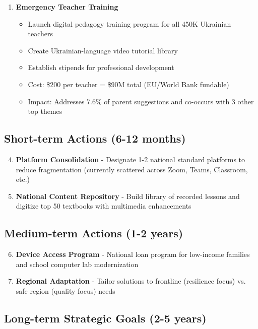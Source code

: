 \documentclass[11pt,a4paper]{article}
\begin{document}
\begin{enumerate}
    \item \textbf{Emergency Teacher Training}
    \begin{itemize}
        \item Launch digital pedagogy training program for all 450K Ukrainian teachers
        \item Create Ukrainian-language video tutorial library
        \item Establish stipends for professional development
        \item Cost: \$200 per teacher = \$90M total (EU/World Bank fundable)
        \item Impact: Addresses 7.6\% of parent suggestions and co-occurs with 3 other top themes
    \end{itemize}
\end{enumerate}

\subsection{Short-term Actions (6-12 months)}

\begin{enumerate}
\setcounter{enumi}{3}
    \item \textbf{Platform Consolidation} - Designate 1-2 national standard platforms to reduce fragmentation (currently scattered across Zoom, Teams, Classroom, etc.)

    \item \textbf{National Content Repository} - Build library of recorded lessons and digitize top 50 textbooks with multimedia enhancements
\end{enumerate}

\subsection{Medium-term Actions (1-2 years)}

\begin{enumerate}
\setcounter{enumi}{5}
    \item \textbf{Device Access Program} - National loan program for low-income families and school computer lab modernization

    \item \textbf{Regional Adaptation} - Tailor solutions to frontline (resilience focus) vs. safe region (quality focus) needs
\end{enumerate}

\subsection{Long-term Strategic Goals (2-5 years)}
\end{document}
